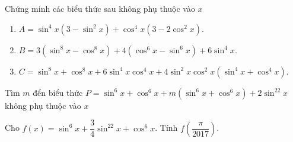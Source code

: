 \begin{bt}%
Chứng minh các biểu thức sau không phụ thuộc vào $x$
\begin{enumerate}
  \item $A=\sin^4x(3-\sin^2x)+\cos^4x(3-2\cos^2x).$
  \item $B=3\left(\sin^8x-\cos^8x\right)+4\left(\cos^6x-\sin^6x\right)+6\sin^4x.$
  \item $C=\sin^8x+\cos^8x+6\sin^4x\cos^4x+4\sin^2x\cos^2x\left(\sin^4x+\cos^4x\right).$
\end{enumerate}
\end{bt}
\begin{bt}%
Tìm $m$ đển biểu thức $P=\sin^6x+\cos^6x+m\left(\sin^6x+\cos^6x\right)+2\sin^22x$ không phụ thuộc vào $x$
\end{bt}
\begin{bt}%
Cho $f(x)=\sin^6x+\dfrac{3}{4}\sin^22x+\cos^6x$. Tính $f\left(\dfrac{\pi}{2017}\right)$.
\end{bt}

